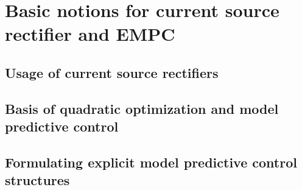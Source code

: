 \section{Basic notions for current source rectifier and EMPC}

	\subsection{Usage of current source rectifiers}

	\subsection{Basis of quadratic optimization and model predictive control}

	\subsection{Formulating explicit model predictive control structures}



